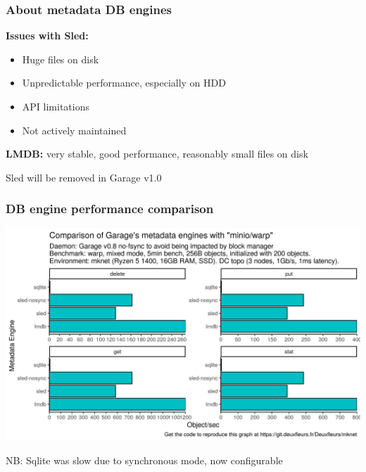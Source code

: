 \documentclass[aspectratio=169]{beamer}
\begin{document}
\begin{frame}
	\frametitle{About metadata DB engines}
	\textbf{Issues with Sled:}
	\vspace{1em}
	\begin{itemize}
		\item Huge files on disk
			\vspace{.5em}
		\item Unpredictable performance, especially on HDD
			\vspace{.5em}
		\item API limitations
			\vspace{.5em}
		\item Not actively maintained
	\end{itemize}

	\vspace{2em}
	\textbf{LMDB:} very stable, good performance, reasonably small files on disk

	\vspace{1em}
	Sled will be removed in Garage v1.0
\end{frame}

\begin{frame}
	\frametitle{DB engine performance comparison}
	\begin{center}
		\includegraphics[width=.6\linewidth]{../assets/perf/db_engine.png}
	\end{center}
	NB: Sqlite was slow due to synchronous mode, now configurable
\end{frame}
\end{document}
